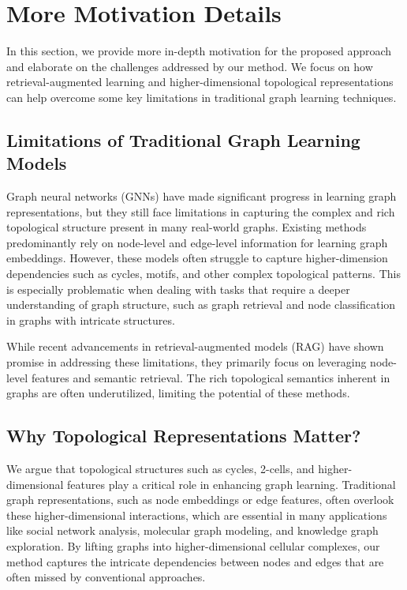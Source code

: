 


\section{More Motivation Details}

In this section, we provide more in-depth motivation for the proposed approach and elaborate on the challenges addressed by our method. We focus on how retrieval-augmented learning and higher-dimensional topological representations can help overcome some key limitations in traditional graph learning techniques.

\subsection{Limitations of Traditional Graph Learning Models}

Graph neural networks (GNNs) have made significant progress in learning graph representations\cite{kipf2017gcn,hamilton2017graphsage,velivckovic2018gat}, but they still face limitations in capturing the complex and rich topological structure present in many real-world graphs. Existing methods predominantly rely on node-level and edge-level information for learning graph embeddings. However, these models often struggle to capture higher-dimension dependencies such as cycles, motifs, and other complex topological patterns\cite{benson2016higher}. This is especially problematic when dealing with tasks that require a deeper understanding of graph structure, such as graph retrieval and node classification in graphs with intricate structures.

While recent advancements in retrieval-augmented models (RAG) have shown promise in addressing these limitations, they primarily focus on leveraging node-level features and semantic retrieval. The rich topological semantics inherent in graphs are often underutilized, limiting the potential of these methods.

\subsection{Why Topological Representations Matter?}

We argue that topological structures such as cycles, 2-cells, and higher-dimensional features play a critical role in enhancing graph learning\cite{hensel2021survey}. Traditional graph representations, such as node embeddings or edge features, often overlook these higher-dimensional interactions, which are essential in many applications like social network analysis, molecular graph modeling, and knowledge graph exploration\cite{gilmer2017mpnn}. By lifting graphs into higher-dimensional cellular complexes, our method captures the intricate dependencies between nodes and edges that are often missed by conventional approaches. 

